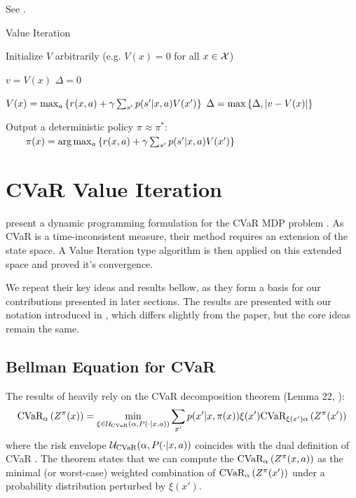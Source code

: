 See .


\begin{algorithm}
\caption{Value Iteration}
\label{alg:vi}
\begin{algorithmic}
    \STATE Initialize $V$ arbitrarily (e.g. $V(x)=0$ for all $x \in \mathcal{X}$)
    
	\REPEAT
	
	\STATE $v = V(x)$
	\STATE $\Delta = 0$
	
	\STATE $V(x) = \max_a\left\{ {r(x, a) + \gamma\sum_{s'}p(s'|x, a)V(x')} \right\}$
	\STATE $\Delta = \max\left\{ {\Delta, |v-V(x)|} \right\}$
	\ENDFOR
	
	\UNTIL{ $\Delta < \epsilon$ }
	
	\STATE Output a deterministic policy $\pi \approx \pi^*$:
   	\STATE $\quad\quad \pi(x) = \text{arg}\max_a\left\{ {r(x, a) + \gamma\sum_{s'}p(s'|x, a)V(x')} \right\}$
\end{algorithmic}
\end{algorithm}


\section{CVaR Value Iteration}\label{sec:vi:cvar}

\citet{chow2015risk} present a dynamic programming formulation for the CVaR MDP problem . As CVaR is a time-inconsistent measure, their method requires an extension of the state space. A Value Iteration type algorithm is then applied on this extended space and \citet{chow2015risk} proved it's convergence. 

We repeat their key ideas and results bellow, as they form a basis for our contributions presented in later sections. The results are presented with our notation introduced in , which differs slightly from the paper, but the core ideas remain the same.

\subsection{Bellman Equation for CVaR}

The results of \citet{chow2015risk} heavily rely on the CVaR decomposition theorem (Lemma 22, \citep{pflug2016time}):
%
\begin{equation}\label{eqn:cvardecomp}
\text{CVaR}_\alpha\left( {Z^\pi(x)} \right) = \min_{\xi \in \mathcal{U}_{\text{CVaR}}(\alpha, P(\cdot | x, a))} \sum_{x'} p(x'| x, \pi(x))\xi(x') \text{CVaR}_{\xi(x')\alpha}\left( {Z^\pi(x')} \right)
\end{equation}
%
where the risk envelope $\mathcal{U}_{\text{CVaR}}(\alpha, P(\cdot | x, a))$ coincides with the dual definition of CVaR .
The theorem states that we can compute the $\text{CVaR}_\alpha\left( {Z^\pi(x, a)} \right)$ as the minimal (or worst-case) weighted combination of $\text{CVaR}_\alpha\left( {Z^\pi(x')} \right)$ under a probability distribution perturbed by $\xi(x')$.

